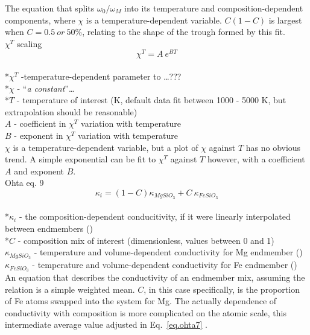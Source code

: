 The equation that splits $\omega_{0}/\omega_{M}$ into its temperature and composition-dependent components, where $\chi$ is a temperature-dependent variable. $C\left ( 1-C \right )$ is largest when $C=0.5\ or\ 50\%$, relating to the shape of the trough formed by this fit.\\

$\chi^{T}$ scaling 
\begin{equation}%
\chi^{T}=A\ e^{BT}
\label{eq.chi_scale}
\end{equation}%
\\ *$\chi^{T}$ -temperature-dependent parameter to \dots ??? \\
*$\chi$ - \enquote{\textit{a constant}}\dots\\
*$T$ - temperature of interest (K, default data fit between 1000 - 5000 K, but extrapolation should be reasonable)\\                    
$A$ - coefficient in $\chi^{T}$ variation with temperature\\
$B$ - exponent in $\chi^{T}$ variation with temperature\\

$\chi$ is a temperature-dependent variable, but a plot of $\chi$ against $T$ has no obvious trend. A simple exponential can be fit to $\chi^{T}$ against $T$ however, with a coefficient $A$ and exponent $B$.\\

Ohta eq. 9 
\begin{equation}%
\kappa_{i}=\left ( 1-C \right )\kappa_{MgSiO_{3}}+C\ \kappa_{FeSiO_{3}}
\label{eq.ohta9}
\end{equation}%
\\ *$\kappa_{i}$ - the composition-dependent conducitivity, if it were linearly interpolated between endmembers (\wmk)\\
*$C$ - composition mix of interest (dimensionless, values between 0 and 1)\\
$\kappa_{MgSiO_{3}}$ - temperature and volume-dependent conductivity for Mg endmember (\wmk)\\
$\kappa_{FeSiO_{3}}$ - temperature and volume-dependent conductivity for Fe endmember (\wmk)\\

An equation that describes the conductivity of an endmember mix, assuming the relation is a simple weighted mean. $C$, in this case specifically, is the proportion of Fe atoms swapped into the system for Mg. The actually dependence of conductivity with composition is more complicated on the atomic scale, this intermediate average value adjusted in Eq.~\ref{eq.ohta7} \citep[][Eq. 7]{Ohta2017}. \\


